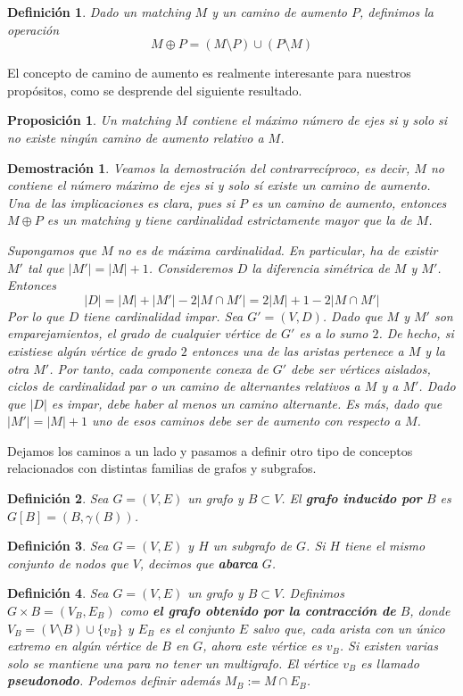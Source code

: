 \documentclass[twoside,a4paper,openright,12pt]{book}
\newtheorem{defi}{Definici\'on}[section]
\newtheorem{prop}{Proposici\'on}[section]
\newtheorem*{dem}{Demostración}
\begin{document}
\begin{defi} 
Dado un matching $M$ y un camino de aumento $P$, definimos la operación 
$$
M\oplus P = (M\setminus P)\cup (P\setminus M)
$$
\end{defi}
El concepto de camino de aumento es realmente interesante para nuestros propósitos, como se desprende del siguiente resultado.
\begin{prop}
Un matching $M$ contiene el máximo número de ejes si y solo si no existe ningún camino de aumento relativo a $M$.
\end{prop}
\begin{dem}
Veamos la demostración del contrarrecíproco, es decir, $M$ no contiene el número máximo de ejes si y solo sí existe un camino de aumento. Una de las implicaciones es clara, pues si $P$ es un camino de aumento, entonces $M\oplus P$ es un matching y tiene cardinalidad estrictamente mayor que la de $M$. 

Supongamos que $M$ no es de máxima cardinalidad. En particular, ha de existir $M'$ tal que $|M'| = |M| +1$. Consideremos $D$ la diferencia simétrica de $M$ y $M'$. Entonces
$$
|D| = |M|+|M'| -2|M\cap M'| = 2|M|+1-2|M\cap M'|
$$
Por lo que $D$ tiene cardinalidad impar. Sea $G' = (V,D)$. Dado que $M$ y $M'$ son emparejamientos, el grado de cualquier vértice de $G'$ es a lo sumo $2$. De hecho, si existiese algún vértice de grado $2$ entonces una de las aristas pertenece a $M$ y la otra $M'$. Por tanto, cada componente conexa de $G'$ debe ser vértices aislados, ciclos de cardinalidad par o un camino de alternantes relativos a $M$ y a $M'$. Dado que $|D|$ es impar, debe haber al menos un camino alternante. Es más, dado que $|M'|=|M|+1$ uno de esos caminos debe ser de aumento con respecto a $M$.
\end{dem}

Dejamos los caminos a un lado y pasamos a definir otro tipo de conceptos relacionados con distintas familias de grafos y subgrafos.
\begin{defi}
Sea $G=(V,E)$ un grafo y $B \subset V$. El \textbf{grafo inducido por }$B$ es $G[B] = (B,\gamma(B))$.  
\end{defi}
\begin{defi}
Sea $G=(V,E)$ y $H$ un subgrafo de $G$. Si $H$ tiene el mismo conjunto de nodos que $V$, decimos que \textbf{abarca }$G$.
\end{defi}
\begin{defi}
Sea $G=(V,E)$ un grafo y $B\subset V$. Definimos $G \times B=(V_B,E_B)$ como \textbf{el grafo obtenido por la contracción de} $B$, donde $V_B = (V \setminus B)\cup \{v_B\}$ y $E_B$ es el conjunto $E$ salvo que, cada arista con un único extremo en algún vértice de $B$ en $G$, ahora este vértice es $v_B$. Si existen varias solo se mantiene una para no tener un multigrafo. El vértice $v_B$ es llamado \textbf{pseudonodo}. Podemos definir además $M_B:= M\cap E_B$.
\end{defi}
\end{document}
